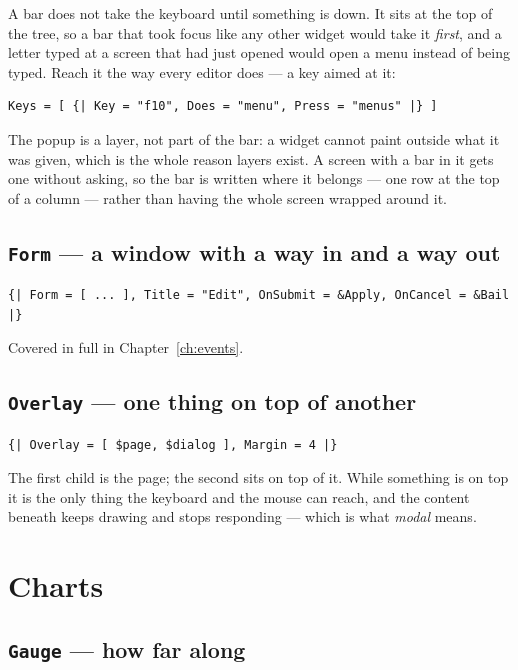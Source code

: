 \documentclass[11pt,a4paper,twoside,openany]{book}
\begin{document}
A bar does not take the keyboard until something is down. It sits at the top of the
tree, so a bar that took focus like any other widget would take it \emph{first}, and
a letter typed at a screen that had just opened would open a menu instead of being
typed. Reach it the way every editor does --- a key aimed at it:

\begin{lstlisting}
Keys = [ {| Key = "f10", Does = "menu", Press = "menus" |} ]
\end{lstlisting}

The popup is a layer, not part of the bar: a widget cannot paint outside what it was
given, which is the whole reason layers exist. A screen with a bar in it gets one
without asking, so the bar is written where it belongs --- one row at the top of a
column --- rather than having the whole screen wrapped around it.

\subsection{\texttt{Form} --- a window with a way in and a way out}

\begin{lstlisting}
{| Form = [ ... ], Title = "Edit", OnSubmit = &Apply, OnCancel = &Bail |}
\end{lstlisting}

Covered in full in Chapter~\ref{ch:events}.

\subsection{\texttt{Overlay} --- one thing on top of another}

\begin{lstlisting}
{| Overlay = [ $page, $dialog ], Margin = 4 |}
\end{lstlisting}

The first child is the page; the second sits on top of it. While something is on
top it is the only thing the keyboard and the mouse can reach, and the content
beneath keeps drawing and stops responding --- which is what \emph{modal} means.

\section{Charts}

\subsection{\texttt{Gauge} --- how far along}
\end{document}
